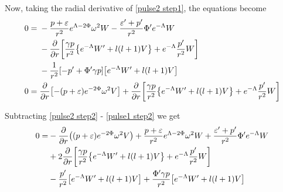 \documentclass[12pt, letterpaper]{report}
\begin{document}
Now, taking the radial derivative of \cref{pulse2 step1}, the equations become
\begin{align}
    0={} & -\frac{p+\varepsilon}{r^2}e^{\Lambda-2\Phi}\omega^2{W}- \frac{\varepsilon'+p'}{r^2}\Phi' e^{-\Lambda}{W}\nonumber\\
    &-\pdv{}{r}\qty[\frac{\gamma p}{r^2}\qty{e^{-\Lambda}W'+l(l+1)V}+e^{-\Lambda}\frac{p'}{r^2}W]\nonumber\\
    &-\frac{1}{r^2}\qty[-p'+ \Phi'\gamma p]\qty[e^{-\Lambda}W'+l(l+1)V]\label{pulse1 step2}\\
   0={} & \pdv{}{r}\qty[-\qty(p+\varepsilon)e^{-2\Phi}\omega^2{V}]+\pdv{}{r}\qty[\frac{\gamma p}{r^2}\qty{e^{-\Lambda}W'+l(l+1)V}+e^{-\Lambda}\frac{p'}{r^2}W]\label{pulse2 step2}
\end{align}

Subtracting \cref{pulse2 step2} - \cref{pulse1 step2} we get
\begin{align}
    0=& -\pdv{}{r}\qty(\qty(p+\varepsilon)e^{-2\Phi}\omega^2{V})+\frac{p+\varepsilon}{r^2}e^{\Lambda-2\Phi}\omega^2{W}+ \frac{\varepsilon'+p'}{r^2}\Phi' e^{-\Lambda}{W}\nonumber\\
    &+2\pdv{}{r}\qty[\frac{\gamma p}{r^2}\qty{e^{-\Lambda}W'+l(l+1)V}+e^{-\Lambda}\frac{p'}{r^2}W]\nonumber\\
    &-\frac{p'}{r^2}\qty[e^{-\Lambda}W'+l(l+1)V]+ \frac{\Phi'\gamma p}{ r^2}\qty[e^{-\Lambda}W'+l(l+1)V]
\end{align}
\end{document}
